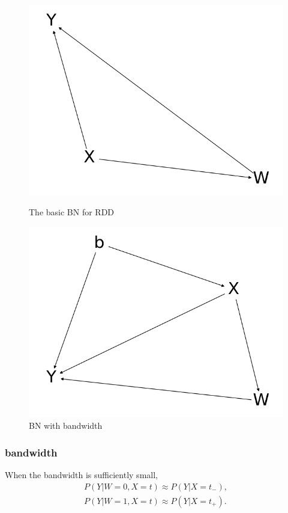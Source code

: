 \documentclass[a4 paper,12pt]{article}
\begin{document}
\begin{figure}[h]
	\centering
   \includegraphics[scale=0.3]{Figure_1.png}
   \caption{The basic BN for RDD}
   \label{fig:basic_rd_bns}
   \includegraphics[scale=0.3]{Figure_2.png}
   \caption{BN with bandwidth}
   \label{fig:bn_with_bdw}
\end{figure}

\subsubsection*{bandwidth}
When the bandwidth is sufficiently small,
\begin{align}
   P(Y|W=0,X=t)\approx P(Y|X=t_-),\\
   P(Y|W=1,X=t)\approx P(Y|X=t_+).
\end{align}
\end{document}
